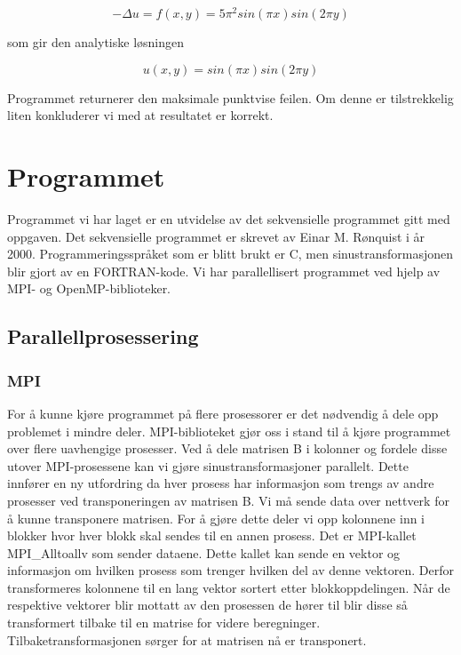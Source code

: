 \documentclass[11pt,norsk,a4paper]{article}
\begin{document}
$$ -\Delta u = f(x,y) = 5\pi^2sin(\pi x)sin(2\pi y) $$

som gir den analytiske løsningen

$$ u(x,y) = sin(\pi x)sin(2\pi y) $$

Programmet returnerer den maksimale punktvise feilen. Om denne er tilstrekkelig liten konkluderer vi med at resultatet er korrekt. 


\section{Programmet}
Programmet vi har laget er en utvidelse av det sekvensielle programmet gitt med oppgaven. Det sekvensielle programmet er skrevet av Einar M. Rønquist i år 2000. Programmeringsspråket som er blitt brukt er C, men sinustransformasjonen blir gjort av en FORTRAN-kode. Vi har parallellisert programmet ved hjelp av MPI- og OpenMP-biblioteker. 

\subsection{Parallellprosessering}

\subsubsection{MPI}
For å kunne kjøre programmet på flere prosessorer er det nødvendig å dele opp problemet i mindre deler. MPI-biblioteket\cite{MPI} gjør oss i stand til å kjøre programmet over flere uavhengige prosesser. Ved å dele matrisen B i kolonner og fordele disse utover MPI-prosessene kan vi gjøre sinustransformasjoner parallelt. Dette innfører en ny utfordring da hver prosess har informasjon som trengs av andre prosesser ved transponeringen av matrisen B. Vi må sende data over nettverk for å kunne transponere matrisen. For å gjøre dette deler vi opp kolonnene inn i blokker hvor hver blokk skal sendes til en annen prosess. Det er MPI-kallet MPI\_Alltoallv som sender dataene. Dette kallet kan sende en vektor og informasjon om hvilken prosess som trenger hvilken del av denne vektoren. Derfor transformeres kolonnene til en lang vektor sortert etter blokkoppdelingen. Når de respektive vektorer blir mottatt av den prosessen de hører til blir disse så transformert tilbake til en matrise for videre beregninger. Tilbaketransformasjonen sørger for at matrisen nå er transponert.
\end{document}

